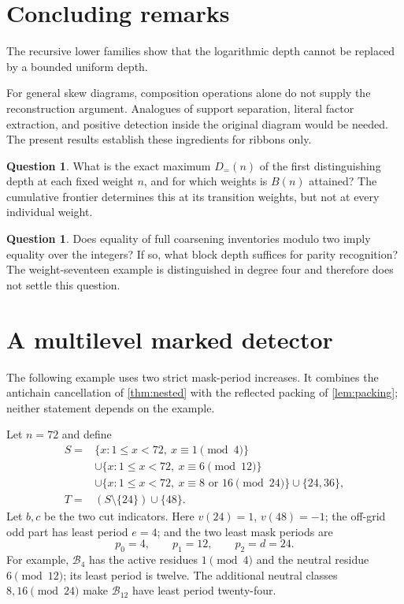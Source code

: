 \documentclass[11pt,a4paper]{amsart}
\numberwithin{equation}{section}
\theoremstyle{plain}
\theoremstyle{definition}
\newtheorem{question}[theorem]{Question}
\begin{document}
\section{Concluding remarks}\label{sec:closing}
The recursive lower families show that the logarithmic depth cannot be
replaced by a bounded uniform depth.

For general skew diagrams, composition operations alone do not supply
the reconstruction argument.  Analogues of support separation, literal factor extraction,
and positive detection inside the original diagram would be needed.
The present results establish these ingredients for ribbons only.

\begin{question}\label{q:fixed-weight}
What is the exact maximum \(D_{=}(n)\) of the first distinguishing depth
at each fixed weight \(n\), and for which weights is \(B(n)\)
attained?  The cumulative frontier determines this at its transition
weights, but not at every individual weight.
\end{question}

\begin{question}\label{q:full-parity}
Does equality of full coarsening inventories modulo two imply equality
over the integers?  If so, what block depth suffices for parity recognition?
The weight-seventeen example is distinguished in degree four and therefore
does not settle this question.
\end{question}

\appendix
{}
\section{A multilevel marked detector}\label{app:multilevel}

The following example uses two strict mask-period increases.  It combines
the antichain cancellation of \cref{thm:nested} with the reflected packing
of \cref{lem:packing}; neither statement depends on the example.

Let \(n=72\) and define
\begin{align*}
S={}&\{x:1\le x<72,\ x\equiv1\pmod4\}\\
&\cup\{x:1\le x<72,\ x\equiv6\pmod{12}\}\\
&\cup\{x:1\le x<72,\ x\equiv8\text{ or }16\pmod{24}\}
\cup\{24,36\},\\
T={}&(S\setminus\{24\})\cup\{48\}.
\end{align*}
Let \(b,c\) be the two cut indicators.  Here \(v(24)=1\), \(v(48)=-1\);
the off-grid odd part has least period \(e=4\); and the two least mask
periods are
\[
p_0=4,\qquad p_1=12,\qquad p_2=d=24.
\]
For example, \(\mathcal B_4\) has the active residues \(1\pmod4\) and the neutral
residue \(6\pmod{12}\); its least period is twelve.  The additional neutral
classes \(8,16\pmod{24}\) make \(\mathcal B_{12}\) have least period twenty-four.
\end{document}
